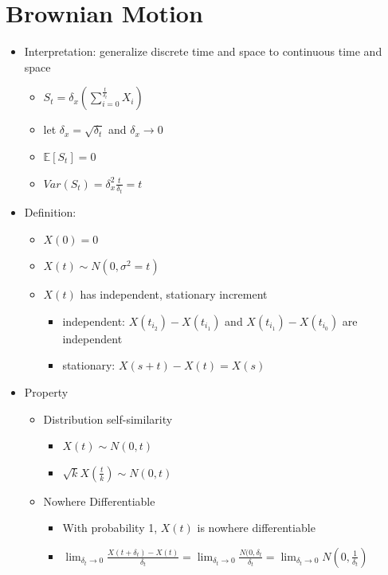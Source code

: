 \documentclass[a4paper]{article}
\begin{document}
\section{Brownian Motion}
\begin{itemize}
    \item Interpretation: generalize discrete time and space to continuous time and space
        \begin{itemize}
            \item $S_t = \delta_x (\sum_{i=0}^{\frac{t}{\delta_t}} X_i)$
            \item let $\delta_x = \sqrt{\delta_t}$ and $\delta_x \rightarrow 0$
            \item $\mathbb{E}[S_t] = 0$
            \item $\mathit{Var}(S_t) = \delta_x^2 \frac{t}{\delta_t} = t$
        \end{itemize}
    \item Definition:
        \begin{itemize}
            \item $X(0) = 0$
            \item $X(t) \sim N(0, \sigma^2 = t)$
            \item $X(t)$ has independent, stationary increment
                \begin{itemize}
                    \item independent: $X(t_{i_2}) - X(t_{i_1})$ and $X(t_{i_1}) - X(t_{i_0})$ are independent
                    \item stationary: $X(s + t) - X(t) = X(s)$
                \end{itemize}
        \end{itemize}
    \item Property
        \begin{itemize}
            \item Distribution self-similarity
                \begin{itemize}
                    \item $X(t) \sim N(0, t)$
                    \item $\sqrt{k}X(\frac{t}{k}) \sim N(0, t)$
                \end{itemize}
            \item Nowhere Differentiable
                \begin{itemize}
                    \item With probability 1, $X(t)$ is nowhere differentiable
                    \item $\lim_{\delta_t \rightarrow 0} \frac{X(t+\delta_t) - X(t)}{\delta_t} = \lim_{\delta_t \rightarrow 0} \frac{N(0, \delta_t}{\delta_t} = \lim_{\delta_t \rightarrow 0} N(0, \frac{1}{\delta_t})$

\end{itemize}
\end{itemize}
\end{itemize}
\end{document}
